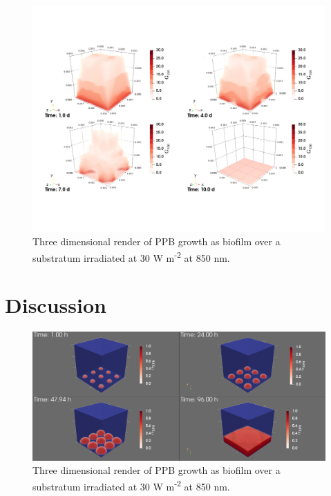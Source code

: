 \begin{figure}[tp]
    \centering
    \includegraphics[width=\textwidth,height=0.5\textheight]{Chap4/results/post_processing/renders/case5_3D/case5_3D_rad.pdf}
    \caption{Three dimensional render of PPB growth as biofilm over a substratum irradiated at 30 W m\textsuperscript{-2} at 850 nm. } 
    \label{fig:case5_3D_rad}
\end{figure}
















\section{Discussion}

\begin{figure}[tp]
    \centering
    \includegraphics[width=\textwidth,height=0.4\textheight]{Chap4/results/xpb_alpha_volumeRender.png}
    \caption{Three dimensional render of PPB growth as biofilm over a substratum irradiated at 30 W m\textsuperscript{-2} at 850 nm. } 
    \label{fig:3d_below_ppb}
\end{figure}




